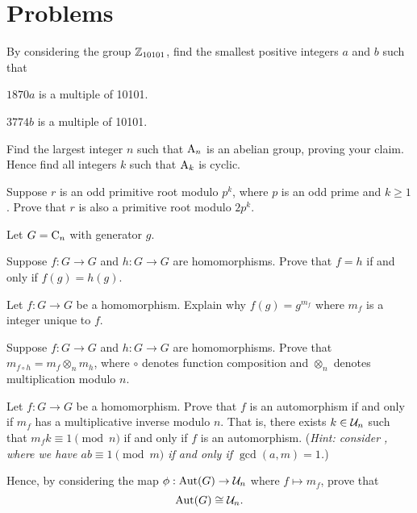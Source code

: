 \newpage

\section{Problems}
\begin{problem}
    By considering the group $\mathbb{Z}_{10101}$, find the smallest positive integers $a$ and $b$ such that
    \begin{partquestions}{\alph*}
        \item $1870a$ is a multiple of 10101.
        \item $3774b$ is a multiple of 10101.
    \end{partquestions}
\end{problem}

\begin{problem}
    Find the largest integer $n$ such that $\mathrm{A}_{n}$ is an abelian group, proving your claim. Hence find all integers $k$ such that $\mathrm{A}_{k}$ is cyclic.
\end{problem}

\begin{problem}
    Suppose $r$ is an odd primitive root modulo $p^k$, where $p$ is an odd prime and $k \geq 1$. Prove that $r$ is also a primitive root modulo $2p^k$.
\end{problem}

\begin{problem}
    Let $G = \mathrm{C}_{n}$ with generator $g$.
    \begin{partquestions}{\roman*}
        \item Suppose $f: G \to G$ and $h: G \to G$ are homomorphisms. Prove that $f = h$ if and only if $f(g) = h(g)$.
        \item Let $f: G \to G$ be a homomorphism. Explain why $f(g) = g^{m_f}$ where $m_f$ is a integer unique to $f$.
        \item Suppose $f: G \to G$ and $h: G \to G$ are homomorphisms. Prove that $m_{f\circ h} = m_f \otimes_n m_h$, where $\circ$ denotes function composition and $\otimes_n$ denotes multiplication modulo $n$.
        \item Let $f: G \to G$ be a homomorphism. Prove that $f$ is an automorphism if and only if $m_f$ has a multiplicative inverse modulo $n$. That is, there exists $k \in \mathcal{U}_{n}$ such that $m_fk \equiv 1 \pmod n$ if and only if $f$ is an automorphism.\newline
        (\textit{Hint: consider , where we have $ab \equiv 1 \pmod m$ if and only if $\gcd(a, m) = 1$.})
        \item Hence, by considering the map $\phi: \mathrm{Aut}(G) \to \mathcal{U}_{n}$ where $f \mapsto m_f$, prove that
        \[
            \mathrm{Aut}(G) \cong \mathcal{U}_{n}.
        \] 
    \end{partquestions}
\end{problem}
